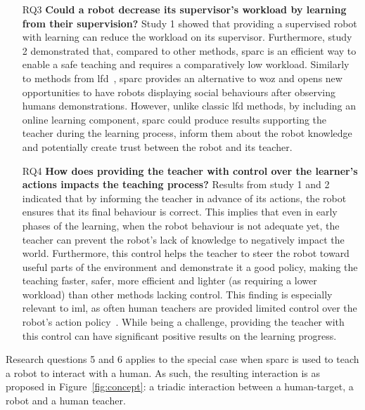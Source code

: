 \begin{itemize}
	\item [RQ3] \textbf{Could a robot decrease its supervisor's workload by learning from their supervision?}
	Study 1 showed that providing a supervised robot with learning can reduce the workload on its supervisor. Furthermore, study 2 demonstrated that, compared to other methods, \gls{sparc} is an efficient way to enable a safe teaching and requires a comparatively low workload. Similarly to methods from \gls{lfd}~\citep{liu2014train,sequeira2016discovering}, \gls{sparc} provides an alternative to \gls{woz} and opens new opportunities to have robots displaying social behaviours after observing humans demonstrations. However, unlike classic \gls{lfd} methods, by including an online learning component, \gls{sparc} could produce results supporting the teacher during the learning process, inform them about the robot knowledge and potentially create trust between the robot and its teacher.
	
	\item [RQ4] \textbf{How does providing the teacher with control over the learner's actions impacts the teaching process?} 
	Results from study 1 and 2 indicated that by informing the teacher in advance of its actions, the robot ensures that its final behaviour is correct. This implies that even in early phases of the learning, when the robot behaviour is not adequate yet, the teacher can prevent the robot's lack of knowledge to negatively impact the world. Furthermore, this control helps the teacher to steer the robot toward useful parts of the environment and demonstrate it a good policy, making the teaching faster, safer, more efficient and lighter (as requiring a lower workload) than other methods lacking control. This finding is especially relevant to \gls{iml}, as often human teachers are provided limited control over the robot's action policy~\citep{thomaz2008teachable,knox2009interactively}. While being a challenge, providing the teacher with this control can have significant positive results on the learning progress.
\end{itemize}

Research questions 5 and 6 applies to the special case when \gls{sparc} is used to teach a robot to interact with a human. As such, the resulting interaction is as proposed in Figure~\ref{fig:concept}: a triadic interaction between a human-target, a robot and a human teacher.

